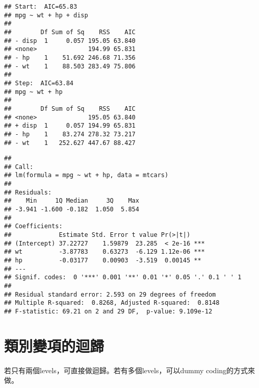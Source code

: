 \documentclass[
]{book}
\newenvironment{Shaded}{\begin{snugshade}}{\end{snugshade}}
\newcommand{\AttributeTok}[1]{\textcolor[rgb]{0.77,0.63,0.00}{#1}}
\newcommand{\CommentTok}[1]{\textcolor[rgb]{0.56,0.35,0.01}{\textit{#1}}}
\newcommand{\DecValTok}[1]{\textcolor[rgb]{0.00,0.00,0.81}{#1}}
\newcommand{\FunctionTok}[1]{\textcolor[rgb]{0.00,0.00,0.00}{#1}}
\newcommand{\NormalTok}[1]{#1}
\newcommand{\OtherTok}[1]{\textcolor[rgb]{0.56,0.35,0.01}{#1}}
\newcommand{\SpecialCharTok}[1]{\textcolor[rgb]{0.00,0.00,0.00}{#1}}
\begin{document}
\begin{verbatim}
## Start:  AIC=65.83
## mpg ~ wt + hp + disp
## 
##        Df Sum of Sq    RSS    AIC
## - disp  1     0.057 195.05 63.840
## <none>              194.99 65.831
## - hp    1    51.692 246.68 71.356
## - wt    1    88.503 283.49 75.806
## 
## Step:  AIC=63.84
## mpg ~ wt + hp
## 
##        Df Sum of Sq    RSS    AIC
## <none>              195.05 63.840
## + disp  1     0.057 194.99 65.831
## - hp    1    83.274 278.32 73.217
## - wt    1   252.627 447.67 88.427
\end{verbatim}

\begin{verbatim}
## 
## Call:
## lm(formula = mpg ~ wt + hp, data = mtcars)
## 
## Residuals:
##    Min     1Q Median     3Q    Max 
## -3.941 -1.600 -0.182  1.050  5.854 
## 
## Coefficients:
##             Estimate Std. Error t value Pr(>|t|)    
## (Intercept) 37.22727    1.59879  23.285  < 2e-16 ***
## wt          -3.87783    0.63273  -6.129 1.12e-06 ***
## hp          -0.03177    0.00903  -3.519  0.00145 ** 
## ---
## Signif. codes:  0 '***' 0.001 '**' 0.01 '*' 0.05 '.' 0.1 ' ' 1
## 
## Residual standard error: 2.593 on 29 degrees of freedom
## Multiple R-squared:  0.8268, Adjusted R-squared:  0.8148 
## F-statistic: 69.21 on 2 and 29 DF,  p-value: 9.109e-12
\end{verbatim}

\hypertarget{ux985eux5225ux8b8aux9805ux7684ux8ff4ux6b78}{%
\section{類別變項的迴歸}\label{ux985eux5225ux8b8aux9805ux7684ux8ff4ux6b78}}

若只有兩個levels，可直接做迴歸。若有多個levels，可以dummy coding的方式來做。

\begin{Shaded}
\end{Shaded}
\end{document}
